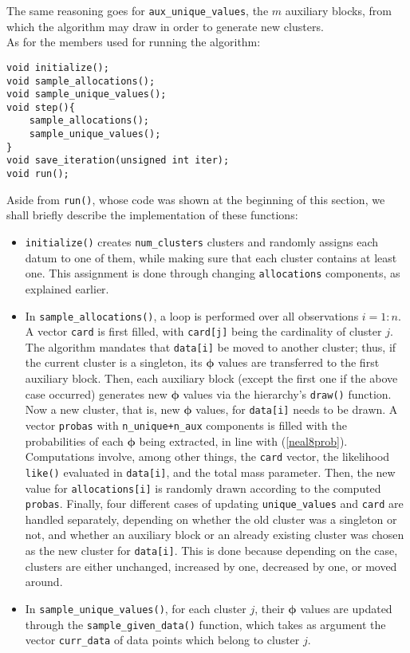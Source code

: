 The same reasoning goes for \verb|aux_unique_values|, the $m$ auxiliary blocks, from which the algorithm may draw in order to generate new clusters. \\
As for the members used for running the algorithm:
\begin{verbatim}
void initialize();
void sample_allocations();
void sample_unique_values();
void step(){
    sample_allocations();
    sample_unique_values();
}
void save_iteration(unsigned int iter);
void run();
\end{verbatim}
Aside from \verb|run()|, whose code was shown at the beginning of this section, we shall briefly describe the implementation of these functions:
\begin{itemize}
	\item \verb|initialize()| creates \verb|num_clusters| clusters and randomly assigns each datum to one of them, while making sure that each cluster contains at least one.
	This assignment is done through changing \verb|allocations| components, as explained earlier.
	\item In \verb|sample_allocations()|, a loop is performed over all observations $i=1:n$.
	A vector \verb|card| is first filled, with \verb|card[j]| being the cardinality of cluster $j$.
	The algorithm mandates that \verb|data[i]| be moved to another cluster; thus, if the current cluster is a singleton, its $\boldsymbol\phi$ values are transferred to the first auxiliary block.
	Then, each auxiliary block (except the first one if the above case occurred) generates new $\boldsymbol\phi$ values via the hierarchy's \verb|draw()| function.
	Now a new cluster, that is, new $\boldsymbol\phi$ values, for \verb|data[i]| needs to be drawn.
	A vector \verb|probas| with \verb|n_unique+n_aux| components is filled with the probabilities of each $\boldsymbol\phi$ being extracted, in line with (\ref{neal8prob}).
	Computations involve, among other things, the \verb|card| vector, the likelihood \verb|like()| evaluated in \verb|data[i]|, and the total mass parameter.
	Then, the new value for \verb|allocations[i]| is randomly drawn according to the computed \verb|probas|.
	Finally, four different cases of updating \verb|unique_values| and \verb|card| are handled separately, depending on whether the old cluster was a singleton or not, and whether an auxiliary block or an already existing cluster was chosen as the new cluster for \verb|data[i]|.
	This is done because depending on the case, clusters are either unchanged, increased by one, decreased by one, or moved around.
	\item In \verb|sample_unique_values()|, for each cluster $j$, their $\boldsymbol\phi$ values are updated through the \verb|sample_given_data()| function, which takes as argument the vector \verb|curr_data| of data points which belong to cluster $j$.

\end{itemize}
